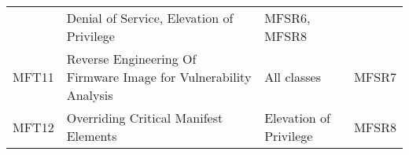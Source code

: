 \documentclass[0-thesis.tex]{subfiles}
\begin{document}
\begin{longtable}[]{@{}llll@{}}
\begin{minipage}[t]{0.44\columnwidth}
    \end{minipage} & \begin{minipage}[t]{0.30\columnwidth}\raggedright\strut
    Denial of Service, Elevation of Privilege\strut
    \end{minipage} & \begin{minipage}[t]{0.09\columnwidth}\raggedright\strut
    MFSR6, MFSR8\strut
    \end{minipage}\tabularnewline
    \begin{minipage}[t]{0.05\columnwidth}\raggedright\strut
    MFT11\strut
    \end{minipage} & \begin{minipage}[t]{0.44\columnwidth}\raggedright\strut
    Reverse Engineering Of Firmware Image for Vulnerability Analysis\strut
    \end{minipage} & \begin{minipage}[t]{0.30\columnwidth}\raggedright\strut
    All classes\strut
    \end{minipage} & \begin{minipage}[t]{0.09\columnwidth}\raggedright\strut
    MFSR7\strut
    \end{minipage}\tabularnewline
    \begin{minipage}[t]{0.05\columnwidth}\raggedright\strut
    MFT12\strut
    \end{minipage} & \begin{minipage}[t]{0.44\columnwidth}\raggedright\strut
    Overriding Critical Manifest Elements\strut
    \end{minipage} & \begin{minipage}[t]{0.30\columnwidth}\raggedright\strut
    Elevation of Privilege\strut
    \end{minipage} & \begin{minipage}[t]{0.09\columnwidth}\raggedright\strut
    MFSR8\strut
    \end{minipage}\tabularnewline
    \bottomrule
\end{longtable}
\end{document}
